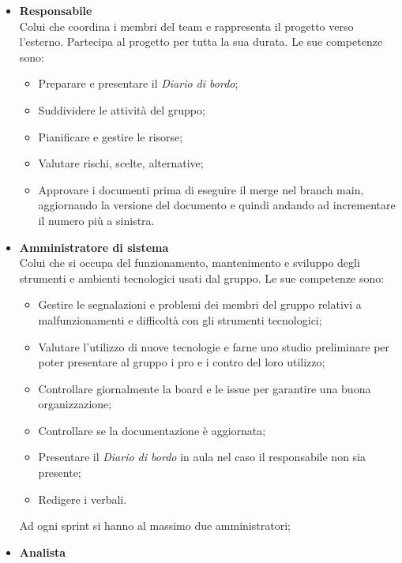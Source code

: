 \begin{itemize}
    \item \textbf{Responsabile}\\
          Colui che coordina i membri del team e rappresenta il progetto verso l'esterno.
          Partecipa al progetto per tutta la sua durata.
          Le sue competenze sono:
          \begin{itemize}
              \item Preparare e presentare il \textit{Diario di bordo};
              \item Suddividere le attività del gruppo;
              \item Pianificare e gestire le risorse;
              \item Valutare rischi, scelte, alternative;
              \item Approvare i documenti prima di eseguire il merge nel branch main, aggiornando
                    la versione del documento e quindi andando ad incrementare il numero più a
                    sinistra.
          \end{itemize}
    \item \textbf{Amministratore di sistema}\\
          Colui che si occupa del funzionamento, mantenimento e sviluppo degli strumenti e ambienti tecnologici
          usati dal gruppo.
          Le sue competenze sono:
          \begin{itemize}
              \item Gestire le segnalazioni e problemi dei membri del gruppo relativi a
                    malfunzionamenti e difficoltà con gli strumenti tecnologici;
              \item Valutare l'utilizzo di nuove tecnologie e farne uno studio preliminare per
                    poter presentare al gruppo i pro e i contro del loro utilizzo;
              \item Controllare giornalmente la board e le issue per garantire una buona
                    organizzazione;
              \item Controllare se la documentazione è aggiornata;
              \item Presentare il \textit{Diario di bordo} in aula nel caso il responsabile non sia
                    presente;
              \item Redigere i verbali.
          \end{itemize}
          Ad ogni sprint si hanno al massimo due amministratori;
    \item \textbf{Analista}\\

\end{itemize}
